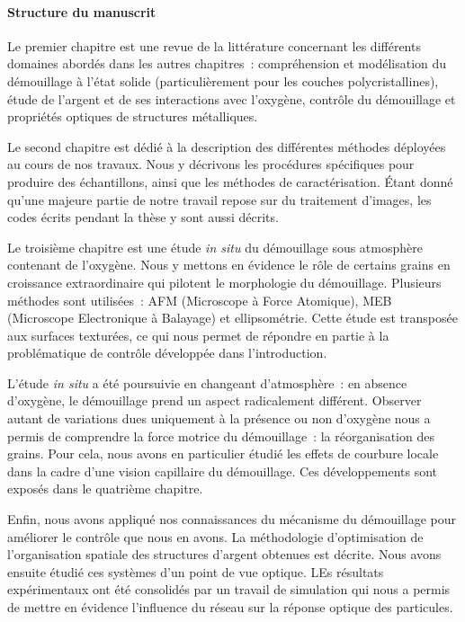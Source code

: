 

\paragraph*{Structure du manuscrit\newline}
Le premier chapitre est une revue de la littérature concernant les différents domaines abordés dans les autres chapitres~: compréhension et modélisation du démouillage à l'état solide (particulièrement pour les couches polycristallines), étude de l'argent et de ses interactions avec l'oxygène, contrôle du démouillage et propriétés optiques de structures métalliques.\par 
Le second chapitre est dédié à la description des différentes méthodes déployées au cours de nos travaux. Nous y décrivons les procédures spécifiques pour produire des échantillons, ainsi que les méthodes de caractérisation. Étant donné qu'une majeure partie de notre travail repose sur du traitement d'images, les codes écrits pendant la thèse y sont aussi décrits.\par 
Le troisième chapitre est une étude \textit{in situ} du démouillage sous atmosphère contenant de l'oxygène. Nous y mettons en évidence le rôle de certains grains en croissance extraordinaire qui pilotent le morphologie du démouillage. Plusieurs méthodes sont utilisées~: AFM (Microscope à Force Atomique), MEB (Microscope Electronique à Balayage) et ellipsométrie. Cette étude est transposée aux surfaces texturées, ce qui nous permet de répondre en partie à la problématique de contrôle développée dans l'introduction.\par 
L'étude \textit{in situ} a été poursuivie en changeant d'atmosphère~: en absence d'oxygène, le démouillage prend un aspect radicalement différent. Observer autant de variations dues uniquement à la présence ou non d'oxygène nous a permis de comprendre la force motrice du démouillage~: la réorganisation des grains. Pour cela, nous avons en particulier étudié les effets de courbure locale dans la cadre d'une vision capillaire du démouillage. Ces développements sont exposés dans le quatrième chapitre.\par 
Enfin, nous avons appliqué nos connaissances du mécanisme du démouillage pour améliorer le contrôle que nous en avons. La méthodologie d'optimisation de l'organisation spatiale des structures d'argent obtenues est décrite. Nous avons ensuite étudié ces systèmes d'un point de vue optique. LEs résultats expérimentaux ont été consolidés par un travail de simulation qui nous a permis de mettre en évidence l'influence du réseau sur la réponse optique des particules.\par 
  


